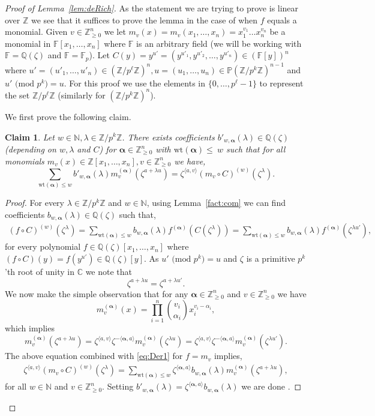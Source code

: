 \documentclass[11pt]{article}
\numberwithin{equation}{section}
\newtheorem{claim}[thm]{Claim}
\def\F{{\mathbb{F}}}
\def\Q{{\mathbb{Q}}}
\def\Z{{\mathbb{Z}}}
\def\N{{\mathbb{N}}}
\def\C{{\mathbb{C}}}
\def\P{{\mathbb{P}}}
\def\balpha{{\bm \alpha}}
\begin{document}
\begin{proof}[Proof of Lemma~\ref{lem:deRich}]
As the statement we are trying to prove is linear over $\Z$ we see that it suffices to prove the lemma in the case of when $f$ equals a monomial. Given $v\in \Z_{\ge 0}^n$ we let $m_v(x)=m_v(x_1,\hdots,x_n)=x_1^{v_1}\hdots x_n^{v_n}$ be a monomial in $\F[x_1,\hdots,x_n]$ where $\F$ is an arbitrary field (we will be working with $\F=\Q(\zeta)$ and $\F=\F_p$).
Let $C(y)=y^{u'}=(y^{u'_1},y^{u'_2},\hdots,y^{u'_n})\in (\F[y])^n$ where $u'=(u'_1,\hdots,u'_n)\in (\Z/p^\ell\Z)^n,u=(u_1,\hdots,u_n)\in \P (\Z/p^k\Z)^{n-1}$ and $u' \text{ (mod }p^k\text{)}=u$. For this proof we use the elements in $ \{0,\hdots, p^\ell -1\}$ to represent the set $\Z/p^\ell\Z$ (similarly for $(\Z/p^k\Z)^n$).

We first prove the following claim.
\begin{claim}\label{cl:inter}
Let $w\in \N, \lambda \in \Z/p^k\Z$. There exists coefficients $b'_{w,\balpha}(\lambda)\in \Q(\zeta)$ (depending on $w,\lambda$ and $C$) for $\balpha\in \Z_{\ge 0}^n$ with $\text{wt}(\balpha)\le~w$ such that for all monomials $m_v(x)\in \Z[x_1,\hdots,x_n],v\in\Z_{\ge 0}^n$ we have,
$$\sum\limits_{\text{wt}(\balpha)\le w} b'_{w,\balpha}(\lambda) m_v^{(\balpha)}(\zeta^{a+\lambda u})=\zeta^{\langle a,v\rangle} (m_v\circ C)^{(w)}(\zeta^\lambda).$$
\end{claim}
\begin{proof}
For every $\lambda \in \Z/p^k\Z$ and $w\in \N$, using Lemma~\ref{fact:com} we can find coefficients $b_{w,\balpha}(\lambda)\in \Q(\zeta)$ such that,
\begin{align}\label{eq:Der1}
(f\circ C)^{(w)}(\zeta^{\lambda})= \sum\limits_{\text{wt}(\balpha)\le w} b_{w,\balpha}(\lambda) f^{(\balpha)}(C(\zeta^{\lambda}))= \sum\limits_{\text{wt}(\balpha)\le w} b_{w,\balpha}(\lambda) f^{(\balpha)}(\zeta^{\lambda u'}),
\end{align}
for every polynomial $f\in \Q(\zeta)[x_1,\hdots,x_n]$ where $(f\circ C)(y)=f(y^{u'})\in \Q(\zeta)[y]$. As $u' \text{ (mod }p^k\text{)}=u$ and $\zeta$ is a primitive $p^k$'th root of unity in $\C$ we note that 
$$\zeta^{a+\lambda u}=\zeta^{a+\lambda u'}.$$
We now make the simple observation that for any $\balpha \in \Z_{\ge 0}^n$ and $v\in \Z_{\ge 0}^n$ we have 
$$m^{(\balpha)}_v(x)=\prod\limits_{i=1}^n\binom{v_i}{\alpha_i} x_i^{v_i-\alpha_i},$$
which implies
$$m^{(\balpha)}_v(\zeta^{a+\lambda u})=\zeta^{\langle a,v\rangle}\zeta^{-\langle \balpha,a\rangle}m^{(\balpha)}_v(\zeta^{\lambda u})=\zeta^{\langle a,v\rangle}\zeta^{-\langle \balpha,a\rangle}m^{(\balpha)}_v(\zeta^{\lambda u'}).$$
The above equation combined with \eqref{eq:Der1} for $f=m_v$ implies,
\begin{align*}
    \zeta^{\langle a,v\rangle} (m_v\circ C)^{(w)}(\zeta^\lambda)=\sum\limits_{\text{wt}(\balpha)\le w} \zeta^{\langle \balpha,a\rangle}b_{w,\balpha}(\lambda) m_v^{(\balpha)}(\zeta^{a+\lambda u}),
\end{align*}
for all $w\in \N$ and $v\in \Z_{\ge 0}^n$. Setting $b'_{w,\balpha}(\lambda)=\zeta^{\langle \balpha,a\rangle}b_{w,\balpha}(\lambda)$ we are done .
\end{proof}


\end{proof}
\end{document}
